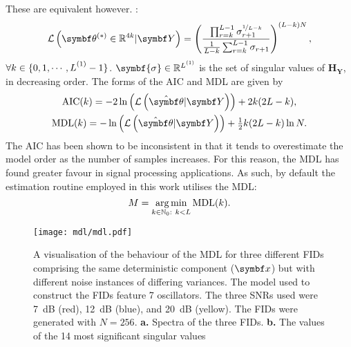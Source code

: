 {{    These are equivalent however.
}:
\begin{equation}
    \mathcal{L}\left(\bthstar \in \mathbb{R}^{4k} | \bY\right) = \left(
        \frac{
            \prod_{r=k}^{L-1} \sigma_{r+1}^{\nicefrac{1}{L-k}}
        }{
            \frac{1}{L-k} \sum_{r=k}^{L-1} \sigma_{r+1}
        }
        \right)^{(L - k) N},
        \label{eq:wax-pdf}
\end{equation}
$\forall k \in \lbrace 0, 1, \cdots, \Lone - 1 \rbrace$. $\symbf{\sigma} \in
\mathbb{R}^{\Lone}$ is the set of singular values of $\symbf{H}_{\symbf{Y}}$,
in decreasing order. The forms of the \ac{AIC} and \ac{MDL} are given by
\begin{subequations}
    \begin{gather}
        \operatorname{AIC}(k) = -2 \ln\left( \mathcal{L} \left(\hat{\bth} | \bY\right) \right) + 2k(2 L - k), \\
        \operatorname{MDL}(k) = -\ln\left( \mathcal{L} \left(\hat{\bth} | \bY\right) \right) + \tfrac{1}{2} k(2 L - k) \ln N. \label{eq:mdl}
    \end{gather}
\end{subequations}
The \ac{AIC} has been shown to be inconsistent in that it tends to overestimate
the model order as the number of samples increases\cite{Wax1985}. For this
reason, the \ac{MDL} has found greater favour in signal processing
applications. As such, by default the estimation routine employed in this work
utilises the \ac{MDL}:
\begin{equation}
    M = \operatorname*{arg\,min}_{k \in \mathbb{N}_0 :\ k < L} \operatorname{MDL} (k).
\end{equation}
\begin{figure}
    \centering
    \texttt{[image: mdl/mdl.pdf]}
    \caption[
        A visualisation of the behaviour of the \acs{MDL} for three different
        \acsp{FID} comprising the same deterministic component, but with
        different noise variances.
    ]{
        A visualisation of the behaviour of the \acs{MDL} for three different
        \acsp{FID} comprising the same deterministic component ($\bx$) but
        with different noise instances of differing variances. The model used
        to construct the \acp{FID} feature 7
        oscillators. The three \acsp{SNR} used were
        \qty{7}{\deci\bel} (red), \qty{12}{\deci\bel} (blue), and
        \qty{20}{\deci\bel} (yellow). The \acsp{FID} were generated with $N
        = 256$.
        \textbf{a.} Spectra of the three \acsp{FID}.
        \textbf{b.} The values of the 14 most significant singular values
}
\end{figure}}
